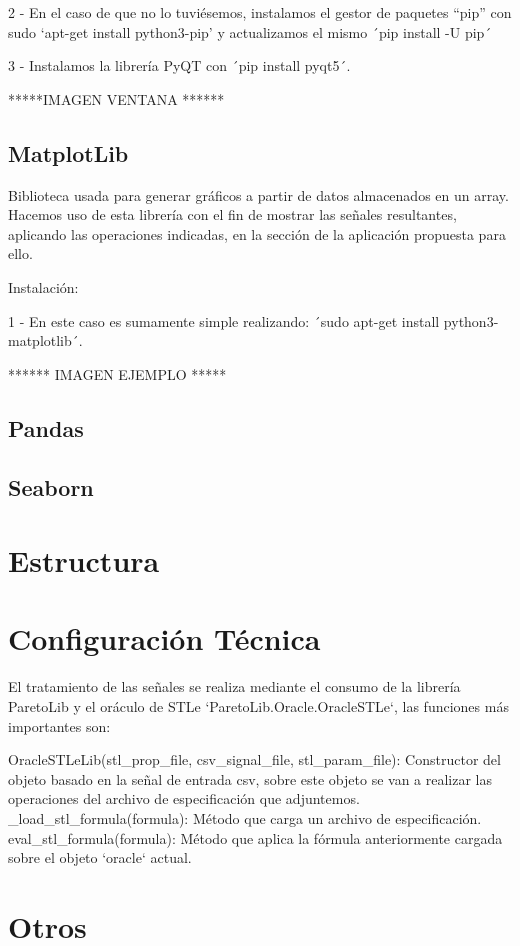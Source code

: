 2 - En el caso de que no lo tuviésemos, instalamos el gestor de paquetes “pip” con sudo ‘apt-get install python3-pip’ y actualizamos el mismo ´pip install -U pip´ 
 
3 - Instalamos la librería PyQT con ´pip install pyqt5´. 
 
*****IMAGEN VENTANA ****** 
 
\subsection{MatplotLib}
Biblioteca usada para generar gráficos a partir de datos almacenados en un array. Hacemos uso de esta librería con el fin de mostrar las señales resultantes, aplicando las operaciones indicadas, en la sección de la aplicación propuesta para ello. 
 
Instalación: 
 
1 - En este caso es sumamente simple realizando: ´sudo apt-get install python3-matplotlib´.
 
****** IMAGEN EJEMPLO *****
 
\subsection{Pandas}

\subsection{Seaborn} 


\section{Estructura}
 
 
\section{Configuración Técnica}
El tratamiento de las señales se realiza mediante el consumo de la librería ParetoLib y el oráculo de STLe `ParetoLib.Oracle.OracleSTLe`, las funciones más importantes son: 
 
OracleSTLeLib(stl_prop_file, csv_signal_file, stl_param_file): Constructor del objeto basado en la señal de entrada csv, sobre este objeto se van a realizar las operaciones del archivo de especificación que adjuntemos. 
_load_stl_formula(formula): Método que carga un archivo de especificación. 
eval_stl_formula(formula): Método que aplica la fórmula anteriormente cargada sobre el objeto `oracle` actual.
 
 
 
 
 
\section{Otros}